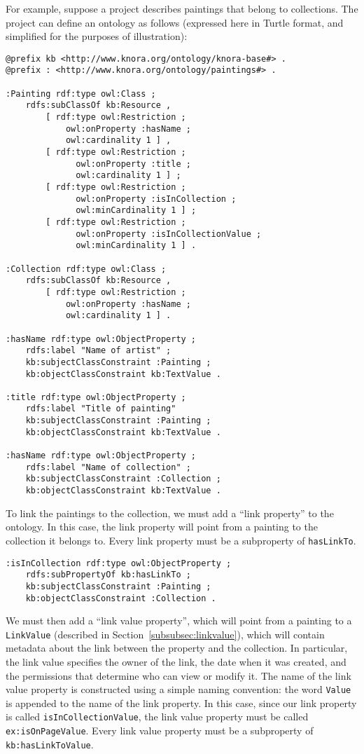 \documentclass[12pt, a4paper]{article}
\begin{document}
For example, suppose a project describes paintings that belong to collections. The project can define an ontology as follows (expressed here in Turtle format, and simplified for the purposes of illustration):

\begin{verbatim}
@prefix kb <http://www.knora.org/ontology/knora-base#> .
@prefix : <http://www.knora.org/ontology/paintings#> .

:Painting rdf:type owl:Class ;
    rdfs:subClassOf kb:Resource ,
        [ rdf:type owl:Restriction ;
            owl:onProperty :hasName ;
            owl:cardinality 1 ] ,
        [ rdf:type owl:Restriction ;
              owl:onProperty :title ;
              owl:cardinality 1 ] ;
        [ rdf:type owl:Restriction ;
              owl:onProperty :isInCollection ;
              owl:minCardinality 1 ] ;
        [ rdf:type owl:Restriction ;
              owl:onProperty :isInCollectionValue ;
              owl:minCardinality 1 ] .

:Collection rdf:type owl:Class ;
    rdfs:subClassOf kb:Resource ,
        [ rdf:type owl:Restriction ;
            owl:onProperty :hasName ;
            owl:cardinality 1 ] .
            
:hasName rdf:type owl:ObjectProperty ;
    rdfs:label "Name of artist" ;
    kb:subjectClassConstraint :Painting ;
    kb:objectClassConstraint kb:TextValue .
            
:title rdf:type owl:ObjectProperty ;
    rdfs:label "Title of painting"
    kb:subjectClassConstraint :Painting ;
    kb:objectClassConstraint kb:TextValue .

:hasName rdf:type owl:ObjectProperty ;
    rdfs:label "Name of collection" ;
    kb:subjectClassConstraint :Collection ;
    kb:objectClassConstraint kb:TextValue .
\end{verbatim}

To link the paintings to the collection, we must add a \enquote{link property} to the ontology. In this case, the link property will point from a painting to the collection it belongs to. Every link property must be a subproperty of \texttt{hasLinkTo}.

\begin{verbatim}
:isInCollection rdf:type owl:ObjectProperty ;
    rdfs:subPropertyOf kb:hasLinkTo ;
    kb:subjectClassConstraint :Painting ;
    kb:objectClassConstraint :Collection .
\end{verbatim}

We must then add a \enquote{link value property}, which will point from a painting to a \texttt{LinkValue} (described in Section~\ref{subsubsec:linkvalue}), which will contain metadata about the link between the property and the collection. In particular, the link value specifies the owner of the link, the date when it was created, and the permissions that determine who can view or modify it. The name of the link value property is constructed using a simple naming convention: the word \texttt{Value} is appended to the name of the link property. In this case, since our link property is called \texttt{isInCollectionValue}, the link value property must be called \texttt{ex:isOnPageValue}. Every link value property must be a subproperty of \texttt{kb:hasLinkToValue}.
\end{document}
